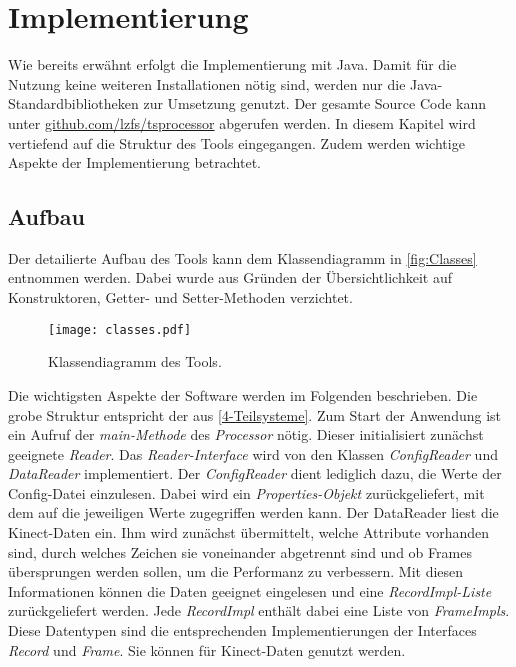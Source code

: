 \chapter{Implementierung}
\label{chapter5}
Wie bereits erwähnt erfolgt die Implementierung mit Java.
Damit für die Nutzung keine weiteren Installationen nötig sind,
werden nur die Java-Standardbibliotheken zur Umsetzung genutzt.
Der gesamte Source Code kann unter \href{https://github.com/lzfs/tsprocessor}{github.com/lzfs/tsprocessor}
abgerufen werden.
In diesem Kapitel wird vertiefend auf die Struktur des Tools eingegangen.
Zudem werden wichtige Aspekte der Implementierung betrachtet.

\section{Aufbau}
\label{5-Aufbau}
Der detailierte Aufbau des Tools kann dem Klassendiagramm in \autoref{fig:Classes} entnommen werden.
Dabei wurde aus Gründen der Übersichtlichkeit auf Konstruktoren,
Getter- und Setter-Methoden verzichtet.
\begin{figure}[p]
    \begin{center}
        \texttt{[image: classes.pdf]}
    \end{center}
    \caption{Klassendiagramm des Tools.}
    \label{fig:Classes}
\end{figure}
Die wichtigsten Aspekte der Software werden im Folgenden beschrieben.
Die grobe Struktur entspricht der aus \autoref{4-Teilsysteme}.
Zum Start der Anwendung ist ein Aufruf der \emph{main-Methode} des \emph{Processor} nötig.
Dieser initialisiert zunächst geeignete \emph{Reader}.
Das \emph{Reader-Interface} wird von den Klassen \emph{ConfigReader} und \emph{DataReader} implementiert.
Der \emph{ConfigReader} dient lediglich dazu, die Werte der Config-Datei einzulesen.
Dabei wird ein \emph{Properties-Objekt} zurückgeliefert,
mit dem auf die jeweiligen Werte zugegriffen werden kann.
Der DataReader liest die Kinect-Daten ein.
Ihm wird zunächst übermittelt, welche Attribute vorhanden sind,
durch welches Zeichen sie voneinander abgetrennt sind
und ob Frames übersprungen werden sollen,
um die Performanz zu verbessern.
Mit diesen Informationen können die Daten geeignet eingelesen und eine \emph{RecordImpl-Liste} zurückgeliefert werden.
Jede \emph{RecordImpl} enthält dabei eine Liste von \emph{FrameImpls}.
Diese Datentypen sind die entsprechenden Implementierungen der Interfaces \emph{Record} und \emph{Frame}.
Sie können für Kinect-Daten genutzt werden.
